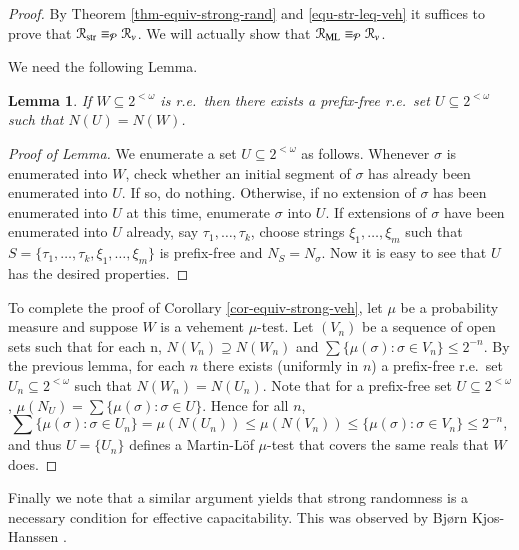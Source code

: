 \documentclass[11pt,reqno]{article}
\theoremstyle{plain}
\newtheorem{lem}{Lemma}
\theoremstyle{definition}
\theoremstyle{remark}
\numberwithin{equation}{section}
\newcommand{\Str}[1][<\omega]{\ensuremath{2^{#1}}}
\newcommand{\Cyl}[1]{\ensuremath{N_{#1}}}
\newcommand{\Acyl}[1]{\ensuremath{N(#1)}}
\newcommand{\Pmeas}{\ensuremath{\CMcal{P}}}
\begin{document}
\begin{proof}
	By Theorem \ref{thm-equiv-strong-rand} and \eqref{equ-str-leq-veh} it suffices to prove that $\mathcal{R}_{\operatorname{str}} \equiv_{\Pmeas} \mathcal{R}_{v}$. We will actually show that $\mathcal{R}_{\operatorname{ML}} \equiv_{\Pmeas} \mathcal{R}_{v}$.
	
	
	
	We need the following Lemma.
	
	\begin{lem}
		If $W \subseteq \Str$ is r.e.\, then there exists a prefix-free r.e.\ set $U \subseteq \Str$ such that $\Acyl{U} = \Acyl{W}$.
	\end{lem}
	
	\begin{proof}[Proof of Lemma] 
		We enumerate a set $U \subseteq \Str$ as follows. Whenever $\sigma$ is enumerated into $W$, check whether an initial segment of $\sigma$ has already been enumerated into $U$. If so, do nothing. Otherwise, if no extension of $\sigma$ has been enumerated into $U$ at this time, enumerate $\sigma$ into $U$. If extensions of $\sigma$ have been enumerated into $U$ already, say $\tau_1, \dots, \tau_k$, choose strings $\xi_1, \dots, \xi_m$ such that $S = \{\tau_1, \dots, \tau_k,\xi_1, \dots, \xi_m\}$ is prefix-free and $\Cyl{S} =\Cyl{\sigma}$. Now it is easy to see that $U$ has the desired properties. 
	 \end{proof}
	
	To complete the proof of Corollary \ref{cor-equiv-strong-veh}, let $\mu$ be a probability measure and suppose $W$ is a vehement $\mu$-test. Let $(V_n)$ be a sequence of open sets such that for each n, $\Acyl{V_n} \supseteq \Acyl{W_n}$ and $\sum \{\mu(\sigma)\colon \sigma \in V_n\} \leq 2^{-n}$. By the previous lemma, for each $n$ there exists (uniformly in $n$) a prefix-free r.e.\ set $U_n \subseteq \Str$ such that $\Acyl{W_n} = \Acyl{U_n}$. Note that for a prefix-free set $U \subseteq \Str$, $\mu(\Cyl{U}) = \sum \{\mu(\sigma)\colon \sigma \in U\}$. Hence for all $n$,
	\[
		\sum \{\mu(\sigma)\colon \sigma \in U_n\} = \mu(\Acyl{U_n}) \leq \mu(\Acyl{V_n}) \leq \{\mu(\sigma)\colon \sigma \in V_n\}  \leq 2^{-n},   
	\] 
	and thus $U = \{U_n\}$ defines a Martin-L\"of $\mu$-test that covers the same reals that $W$ does.
 \end{proof}

Finally we note that a similar argument yields that strong randomness is a necessary condition for effective capacitability.
This was observed by Bj{\o}rn Kjos-Hanssen \citep{kjos-hanssen:email}.
\end{document}
